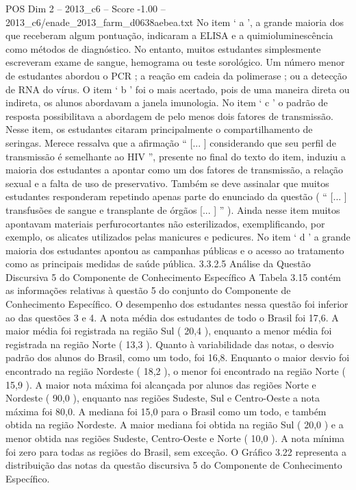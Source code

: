 \begin{textsample}{POS Dim 2 – 2013\_c6 – Score -1.00 – 2013\_c6/enade\_2013\_farm\_d0638aebea.txt}
No item ‘ a ’, a grande maioria dos que receberam algum pontuação, indicaram a ELISA e a quimioluminescência como métodos de diagnóstico.
No entanto, muitos estudantes simplesmente escreveram exame de sangue, hemograma ou teste sorológico.
Um número menor de estudantes abordou o PCR ; a reação em cadeia da polimerase ; ou a detecção de RNA do vírus.
O item ‘ b ’ foi o mais acertado, pois de uma maneira direta ou indireta, os alunos abordavam a janela imunologia.
No item ‘ c ’ o padrão de resposta possibilitava a abordagem de pelo menos dois fatores de transmissão.
Nesse item, os estudantes citaram principalmente o compartilhamento de seringas.
Merece ressalva que a afirmação “ [... ] considerando que seu perfil de transmissão é semelhante ao HIV ”, presente no final do texto do item, induziu a maioria dos estudantes a apontar como um dos fatores de transmissão, a relação sexual e a falta de uso de preservativo.
Também se deve assinalar que muitos estudantes responderam repetindo apenas parte do enunciado da questão ( “ [... ] transfusões de sangue e transplante de órgãos [... ] ” ).
Ainda nesse item muitos apontavam materiais perfurocortantes não esterilizados, exemplificando, por exemplo, os alicates utilizados pelas manicures e pedicures.
No item ‘ d ’ a grande maioria dos estudantes apontou as campanhas públicas e o acesso ao tratamento como as principais medidas de saúde pública. 3.3.2.5 Análise da Questão Discursiva 5 do Componente de Conhecimento Específico A Tabela 3.15 contém as informações relativas à questão 5 do conjunto do Componente de Conhecimento Específico.
O desempenho dos estudantes nessa questão foi inferior ao das questões 3 e 4.
A nota média dos estudantes de todo o Brasil foi 17,6.
A maior média foi registrada na região Sul ( 20,4 ), enquanto a menor média foi registrada na região Norte ( 13,3 ).
Quanto à variabilidade das notas, o desvio padrão dos alunos do Brasil, como um todo, foi 16,8.
Enquanto o maior desvio foi encontrado na região Nordeste ( 18,2 ), o menor foi encontrado na região Norte ( 15,9 ).
A maior nota máxima foi alcançada por alunos das regiões Norte e Nordeste ( 90,0 ), enquanto nas regiões Sudeste, Sul e Centro-Oeste a nota máxima foi 80,0.
A mediana foi 15,0 para o Brasil como um todo, e também obtida na região Nordeste.
A maior mediana foi obtida na região Sul ( 20,0 ) e a menor obtida nas regiões Sudeste, Centro-Oeste e Norte ( 10,0 ).
A nota mínima foi zero para todas as regiões do Brasil, sem exceção.
O Gráfico 3.22 representa a distribuição das notas da questão discursiva 5 do Componente de Conhecimento Específico.

\end{textsample}
